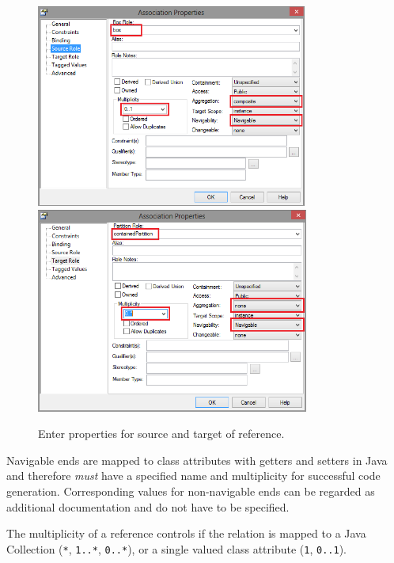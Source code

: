 \begin{enumerate}
\begin{figure}[htbp]
	\centering
  \includegraphics[width=0.8\textwidth]{pics/memBoxBilder/memBox26.png}\\
  \vspace{0.5cm}
  \includegraphics[width=0.8\textwidth]{pics/memBoxBilder/memBox27.png}
	\caption{Enter properties for source and target of reference.}
	\label{fig:reference_ends}
\end{figure}
\end{enumerate}

Navigable ends are mapped to class attributes with getters and setters in Java and therefore \emph{must} have a specified name and  multiplicity for successful code generation.
Corresponding values for non-navigable ends can  be regarded as additional documentation and do not have to be specified.

The multiplicity of a reference controls if the relation is mapped to a Java Collection (\texttt{*},  \texttt{1..*}, \texttt{0..*}), or a single valued class attribute (\texttt{1}, \texttt{0..1}).

